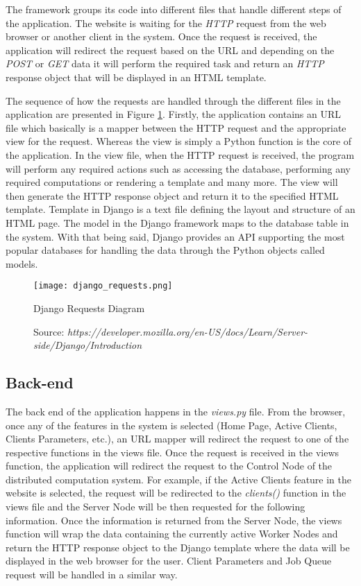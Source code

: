 \documentclass[10pt]{report}
\begin{document}
The framework groups its code into different files that handle different steps of the application. The website is waiting for the \textit{HTTP} request from the web browser or another client in the system. Once the request is received, the application will redirect the request based on the URL and depending on the \textit{POST} or \textit{GET} data it will perform the required task and return an \textit{HTTP} response object that will be displayed in an HTML template.
\newline

The sequence of how the requests are handled through the different files in the application are presented in Figure \ref{fig:djangoreq}. Firstly, the application contains an URL file which basically is a mapper between the HTTP request and the appropriate view for the request. Whereas the view is simply a Python function is the core of the application. In the view file, when the HTTP request is received, the program will perform any required actions such as accessing the database, performing any required computations or rendering a template and many more. The view will then generate the HTTP response object and return it to the specified HTML template. Template in Django is a text file defining the layout and structure of an HTML page. The model in the Django framework maps to the database table in the system. With that being said, Django provides an API supporting the most popular databases for handling the data through the Python objects called models.

\begin{figure}[htp]
    \centering
    \texttt{[image: django\_requests.png]}
    \caption{Django Requests Diagram}
    \label{fig:djangoreq}
    \caption*{Source: \textit{https://developer.mozilla.org/en-US/docs/Learn/Server-side/Django/Introduction}}
\end{figure}

\subsection{Back-end}

The back end of the application happens in the \textit{views.py} file. From the browser, once any of the features in the system is selected (Home Page, Active Clients, Clients Parameters, etc.), an URL mapper will redirect the request to one of the respective functions in the views file. Once the request is received in the views function, the application will redirect the request to the Control Node of the distributed computation system. For example, if the Active Clients feature in the website is selected, the request will be redirected to the \textit{clients()} function in the views file and the Server Node will be then requested for the following information. Once the information is returned from the Server Node, the views function will wrap the data containing the currently active Worker Nodes and return the HTTP response object to the Django template where the data will be displayed in the web browser for the user. Client Parameters and Job Queue request will be handled in a similar way.
\newline
\end{document}
